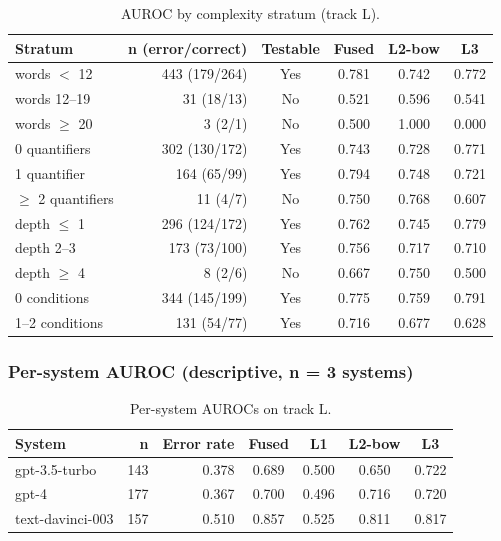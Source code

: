 \documentclass[11pt,letterpaper]{article}
\begin{document}
\begin{table}[!htbp]
\centering
\caption{AUROC by complexity stratum (track L).}
\label{tab:complexity_strata}
\begin{tabular}{lrcccc}
\toprule
Stratum & n (error/correct) & Testable & Fused & L2-bow & L3 \\
\midrule
words $<$ 12 & 443 (179/264) & Yes & 0.781 & 0.742 & 0.772 \\
words 12--19 & 31 (18/13) & No & 0.521 & 0.596 & 0.541 \\
words $\geq$ 20 & 3 (2/1) & No & 0.500 & 1.000 & 0.000 \\
0 quantifiers & 302 (130/172) & Yes & 0.743 & 0.728 & 0.771 \\
1 quantifier & 164 (65/99) & Yes & 0.794 & 0.748 & 0.721 \\
$\geq$ 2 quantifiers & 11 (4/7) & No & 0.750 & 0.768 & 0.607 \\
depth $\leq$ 1 & 296 (124/172) & Yes & 0.762 & 0.745 & 0.779 \\
depth 2--3 & 173 (73/100) & Yes & 0.756 & 0.717 & 0.710 \\
depth $\geq$ 4 & 8 (2/6) & No & 0.667 & 0.750 & 0.500 \\
0 conditions & 344 (145/199) & Yes & 0.775 & 0.759 & 0.791 \\
1--2 conditions & 131 (54/77) & Yes & 0.716 & 0.677 & 0.628 \\
\bottomrule
\end{tabular}
\end{table}

\subsubsection{Per-system AUROC (descriptive, n = 3 systems)}

\begin{table}[!htbp]
\centering
\caption{Per-system AUROCs on track L.}
\label{tab:persystem_auroc}
\begin{tabular}{lrrcccc}
\toprule
System & n & Error rate & Fused & L1 & L2-bow & L3 \\
\midrule
gpt-3.5-turbo & 143 & 0.378 & 0.689 & 0.500 & 0.650 & 0.722 \\
gpt-4 & 177 & 0.367 & 0.700 & 0.496 & 0.716 & 0.720 \\
text-davinci-003 & 157 & 0.510 & 0.857 & 0.525 & 0.811 & 0.817 \\
\bottomrule
\end{tabular}
\end{table}
\end{document}
